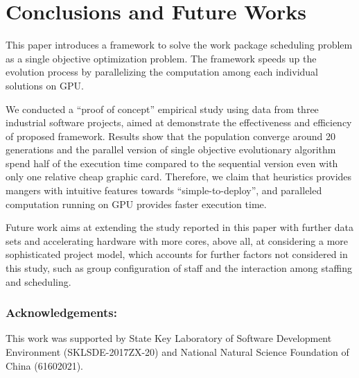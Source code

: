 %
%

\section{Conclusions and Future Works}
%
This paper introduces a framework to solve the work package scheduling problem as a single objective optimization problem. The framework speeds up the evolution process by parallelizing the computation among each individual solutions on GPU. 

We conducted a ``proof of concept'' empirical study using data from three industrial software projects, aimed at demonstrate the effectiveness and efficiency of proposed framework.
Results show that the population converge around 20 generations and the parallel version of single objective evolutionary algorithm spend half of the execution time compared to the sequential version even with only one relative cheap graphic card. 
Therefore, we claim that heuristics provides mangers with intuitive features towards ``simple-to-deploy'', and paralleled computation running on GPU provides faster execution time.

Future work aims at extending the study reported in this paper with further data sets and accelerating hardware with more cores, above all, at considering a more sophisticated project model, which accounts for further factors not considered in this study, such as group configuration of staff and the interaction among staffing and scheduling.

\subsubsection{\small{Acknowledgements:}} \small{This work was supported by State Key Laboratory of Software Development Environment (SKLSDE-2017ZX-20) and National Natural Science Foundation of China (61602021).}

